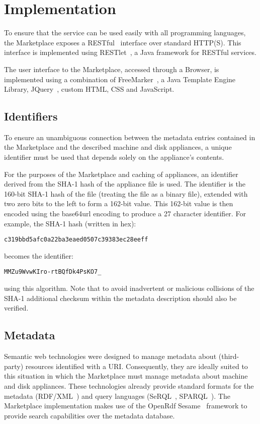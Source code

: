 \section{Implementation}
\label{sec:implementation}

To ensure that the service can be used easily with all programming
languages, the Marketplace exposes a RESTful~\cite{rest} interface
over standard HTTP(S).  This interface is implemented using
RESTlet~\cite{restlet}, a Java framework for RESTful services.

The user interface to the Marketplace, accessed through a Browser, is
implemented using a combination of FreeMarker~\cite{freemarker}, a
Java Template Engine Library, JQuery~\cite{jquery}, custom HTML, CSS
and JavaScript.

\subsection{Identifiers}

To ensure an unambiguous connection between the metadata entries
contained in the Marketplace and the described machine and disk
appliances, a unique identifier must be used that depends solely on
the appliance's contents.

For the purposes of the Marketplace and caching of appliances, an
identifier derived from the SHA-1 hash of the appliance file is used.  The
identifier is the 160-bit SHA-1 hash of the file (treating the
file as a binary file), extended with two zero bits to the left to
form a 162-bit value.  This 162-bit value is then encoded using the
base64url encoding to produce a 27 character identifier.  For
example, the SHA-1 hash (written in hex):
\begin{verbatim}
c319bbd5afc0a22ba3eaed0507c39383ec28eeff
\end{verbatim}
becomes the identifier:
\begin{verbatim}
MMZu9WvwKIro-rtBQfDk4PsKO7_
\end{verbatim}
using this algorithm.  Note that to avoid inadvertent or malicious
collisions of the SHA-1 additional checksum within the metadata
description should also be verified.

\subsection{Metadata}

Semantic web technologies were designed to manage metadata about
(third-party) resources identified with a URI.  Consequently, they are
ideally suited to this situation in which the Marketplace must manage
metadata about machine and disk appliances.  These technologies already
provide standard formats for the metadata (RDF/XML~\cite{rdfxml,
  rdfprimer, rdfschema}) and query languages (SeRQL~\cite{serql},
SPARQL~\cite{sparql}).  The Marketplace implementation makes use of the
OpenRdf Sesame~\cite{sesame} framework to provide search
capabilities over the metadata database.

